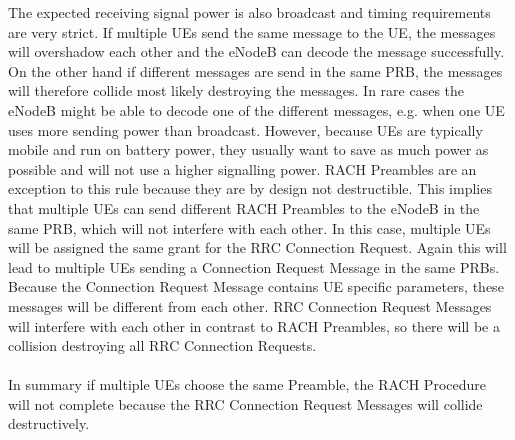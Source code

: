 \documentclass[conference]{IEEEtran}
\begin{document}
The expected receiving signal power is also broadcast and timing requirements are very strict.
If multiple UEs send the same message to the UE, the messages will overshadow each other and the eNodeB can decode the message successfully.
On the other hand if different messages are send in the same PRB, the messages will therefore collide most likely destroying the messages.
In rare cases the eNodeB might be able to decode one of the different messages, e.g. when one UE uses more sending power than broadcast.
However, because UEs are typically mobile and run on battery power, they usually want to save as much power as possible and will not use a higher signalling power.
RACH Preambles are an exception to this rule because they are by design not destructible.
This implies that multiple UEs can send different RACH Preambles to the eNodeB in the same PRB, which will not interfere with each other.
In this case, multiple UEs will be assigned the same grant for the RRC Connection Request.
Again this will lead to multiple UEs sending a Connection Request Message in the same PRBs.
Because the Connection Request Message contains UE specific parameters, these messages will be different from each other.
RRC Connection Request Messages will interfere with each other in contrast to RACH Preambles, so there will be a collision destroying all RRC Connection Requests.\\\\
In summary if multiple UEs choose the same Preamble, the RACH Procedure will not complete because the RRC Connection Request Messages will collide destructively.
\end{document}
